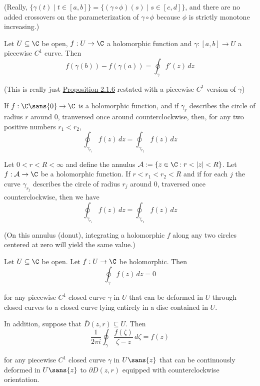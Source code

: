 (Really, $\{\gamma(t)\mid t\in[a,b]\}=\{(\gamma\circ\phi)(s)\mid s
\in[c,d]\}$, and there are no added crossovers on the parameterization
of $\gamma\circ\phi$ because $\phi$ is strictly monotone increasing.)

\label{cd28a8f}

Let $U\subseteq\C$ be open, $f:U\to\C$ a holomorphic function and
$\gamma:[a,b]\to U$ a piecewise $C^1$ curve. Then
$$
  f(\gamma(b))-f(\gamma(a))=\oint_\gamma f'(z)\,dz
$$

(This is really just \href{c526c09}{Proposition 2.1.6} restated
with a piecewise $C^1$ version of $\gamma$)

\label{b52bca5}

If $f:\C\sans{0}\to\C$ is a holomorphic function, and if $\gamma_r$ describes
the circle of radius $r$ around $0$, tranversed once around counterclockwise,
then, for any two positive numbers $r_1<r_2$,
$$
  \oint_{\gamma_{r_1}}f(z)\,dz=\oint_{\gamma_{r_2}}f(z)\,dz
$$

\label{ecbc559}

Let $0<r<R<\infty$ and define the annulus $\mathcal A:=\{z\in\C:r<|z|<R\}$. Let
$f:\mathcal A\to\C$ be a holomorphic function. If $r<r_1<r_2<R$ and if for each
$j$ the curve $\gamma_{r_j}$ describes the circle of radius $r_j$ around 0,
traversed once counterclockwise, then we have
$$
  \oint_{\gamma_{r_1}}f(z)\,dz=\oint_{\gamma_{r_2}}f(z)\,dz
$$

(On this annulus (donut), integrating a holomorphic $f$ along any two
circles centered at zero will yield the same value.)

\label{be5c80c}

Let $U\subseteq\C$ be open. Let $f:U\to\C$ be holomorphic. Then
$$\oint_\gamma f(z)\,dz=0$$

for any piecewise $C^1$ closed curve $\gamma$ in $U$ that can be deformed in
$U$ through closed curves to a closed curve lying entirely in a disc contained
in $U$.

In addition, suppose that $\overline D(z,r)\subseteq U$. Then
$$
  \frac1{2\pi i}\oint_\gamma\frac{f(\zeta)}{\zeta-z}\,d\zeta=f(z)
$$

for any piecewise $C^1$ closed curve $\gamma$ in $U\sans{z}$ that can be
continuously deformed in $U\sans{z}$ to $\partial D(z,r)$ equipped with
counterclockwise orientation.

\label{e20a4ed}

